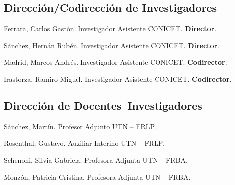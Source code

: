 \subsection{Dirección/Codirección de Investigadores}
\begin{timeline}
 Ferrara, Carlos Gastón. Investigador Asistente CONICET. \textbf{Director}.

 Sánchez, Hernán Rubén. Investigador Asistente CONICET. \textbf{Director}.

 Madrid, Marcos Andrés. Investigador Asistente CONICET. \textbf{Codirector}.

 Irastorza, Ramiro Miguel. Investigador Asistente CONICET. \textbf{Codirector}.
\end{timeline}

\subsection{Dirección de Docentes--Investigadores}
\begin{timeline}
 Sánchez, Martín. Profesor Adjunto UTN -- FRLP.

 Rosenthal, Gustavo. Auxiliar Interino UTN -- FRLP.

 Schenoni, Silvia Gabriela. Profesora Adjunta UTN -- FRBA.

 Monzón, Patricia Cristina. Profesora Adjunta UTN -- FRBA.
\end{timeline}